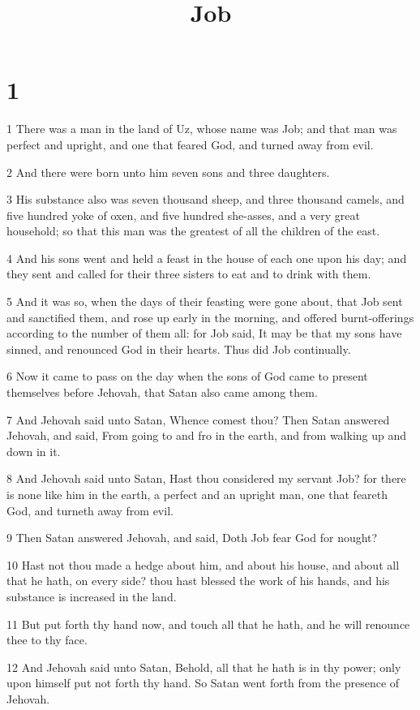 

\title{Job}

\chapter{1}

\par 1 There was a man in the land of Uz, whose name was Job; and that man was perfect and upright, and one that feared God, and turned away from evil.
\par 2 And there were born unto him seven sons and three daughters.
\par 3 His substance also was seven thousand sheep, and three thousand camels, and five hundred yoke of oxen, and five hundred she-asses, and a very great household; so that this man was the greatest of all the children of the east.
\par 4 And his sons went and held a feast in the house of each one upon his day; and they sent and called for their three sisters to eat and to drink with them.
\par 5 And it was so, when the days of their feasting were gone about, that Job sent and sanctified them, and rose up early in the morning, and offered burnt-offerings according to the number of them all: for Job said, It may be that my sons have sinned, and renounced God in their hearts. Thus did Job continually.
\par 6 Now it came to pass on the day when the sons of God came to present themselves before Jehovah, that Satan also came among them.
\par 7 And Jehovah said unto Satan, Whence comest thou? Then Satan answered Jehovah, and said, From going to and fro in the earth, and from walking up and down in it.
\par 8 And Jehovah said unto Satan, Hast thou considered my servant Job? for there is none like him in the earth, a perfect and an upright man, one that feareth God, and turneth away from evil.
\par 9 Then Satan answered Jehovah, and said, Doth Job fear God for nought?
\par 10 Hast not thou made a hedge about him, and about his house, and about all that he hath, on every side? thou hast blessed the work of his hands, and his substance is increased in the land.
\par 11 But put forth thy hand now, and touch all that he hath, and he will renounce thee to thy face.
\par 12 And Jehovah said unto Satan, Behold, all that he hath is in thy power; only upon himself put not forth thy hand. So Satan went forth from the presence of Jehovah.

